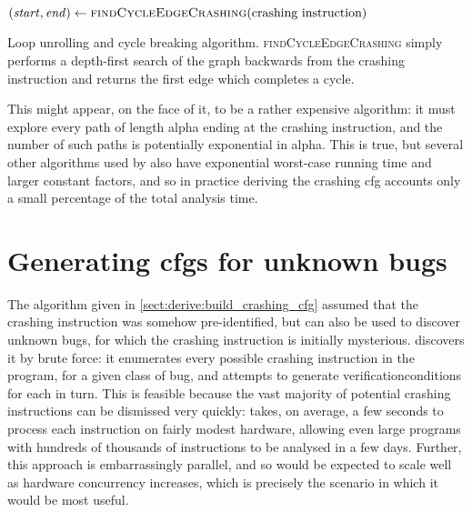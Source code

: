 \begin{sanefig}
\begin{algorithmic}
     \State $(\mathit{start}, \mathit{end}) \gets \textsc{findCycleEdgeCrashing}(\text{crashing instruction})$
        \EndFor
     \EndIf
  \EndWhile
  \EndFunction
\end{algorithmic}
\caption{Loop unrolling and cycle breaking algorithm.
  \textsc{findCycleEdgeCrashing} simply performs a depth-first search
  of the graph backwards from the crashing instruction and returns the
  first edge which completes a cycle.}
\label{fig:derive:read:unroll_cycle_break}
\end{sanefig}

\addtocounter{figure}{1}

This might appear, on the face of it, to be a rather expensive
algorithm: it must explore every path of length \gls{alpha} ending at
the crashing instruction, and the number of such paths is potentially
exponential in \gls{alpha}.  This is true, but several other
algorithms used by {\implementation} also have exponential worst-case
running time and larger constant factors, and so in practice deriving
the crashing \gls{cfg} accounts only a small percentage of the total
analysis time.


\section{Generating \protect\glspl{cfg} for unknown bugs}
\label{sect:derive:unknown_bugs}

The algorithm given in \autoref{sect:derive:build_crashing_cfg}
assumed that the \gls{crashing instruction} was somehow
pre-identified, but {\technique} can also be used to discover unknown
bugs, for which the \gls{crashing instruction} is initially
mysterious.  {\Technique} discovers it by brute force: it enumerates
every possible \gls{crashing instruction} in the program, for a given
class of bug, and attempts to generate \glspl{verificationcondition}
for each in turn.  This is feasible because the vast majority of
potential \glspl{crashing instruction} can be dismissed very quickly:
{\implementation} takes, on average, a few seconds to process each
instruction on fairly modest hardware, allowing even large programs
with hundreds of thousands of instructions to be analysed in a few
days.  Further, this approach is embarrassingly parallel, and so would
be expected to scale well as hardware concurrency increases, which is
precisely the scenario in which it would be most useful.

